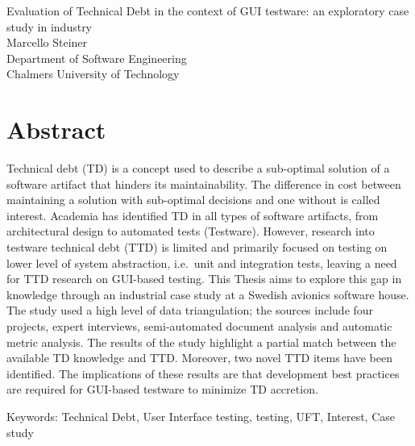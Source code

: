 Evaluation of Technical Debt in the context of GUI testware: an exploratory case study in industry\\
Marcello Steiner\\
Department of Software Engineering\\
Chalmers University of Technology\\

\thispagestyle{plain}			%
\section*{Abstract}
Technical debt (TD) is a concept used to describe
a sub-optimal solution of a software artifact that hinders its maintainability.
The difference in cost between maintaining a solution with sub-optimal decisions and one without is called interest. Academia has identified TD in all types of software artifacts,
from architectural design to automated tests (Testware). However,
research into testware technical debt (TTD) is limited and
primarily focused on testing on lower level of system abstraction,
i.e.\ unit and integration tests, leaving a need for TTD research
on GUI-based testing. This Thesis aims to explore this gap in knowledge through an
industrial case study at a Swedish avionics software house. The study used a high level of data triangulation; the sources include four projects, expert interviews, semi-automated document analysis and automatic metric analysis. The results of the study highlight a partial match between the available TD knowledge and TTD. Moreover, two novel TTD items have been identified. The implications of these results are that development best practices are required
for GUI-based testware to minimize TD accretion.

\vfill
Keywords: Technical Debt, User Interface testing, testing, UFT, Interest, Case study

\newpage				%
\thispagestyle{empty}
\mbox{}